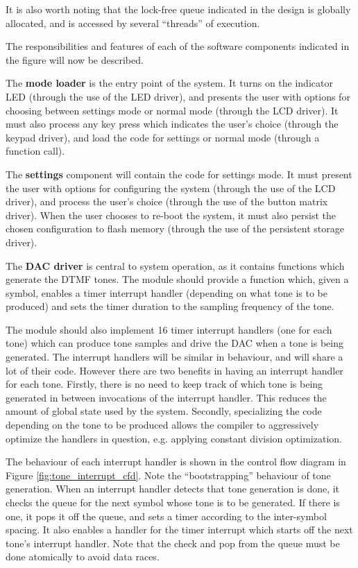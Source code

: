 \documentclass[11pt,a4paper
]{scrartcl}
\begin{document}
It is also worth noting that the lock-free queue indicated in the design is globally allocated, and is accessed by several ``threads'' of execution.

The responsibilities and features of each of the software components indicated in the figure will now be described.

The \textbf{mode loader} is the entry point of the system. It turns on the indicator LED (through the use of the LED driver), and presents the user with options
for choosing between settings mode or normal mode (through the LCD driver). It must also process any key press which indicates the user's choice 
(through the keypad driver), and load the code for settings or normal mode (through a function call).

The \textbf{settings} component will contain the code for settings mode. It must present the user with options for configuring the system (through the use of the
LCD driver), and process the user's choice (through the use of the button matrix driver). When the user chooses to re-boot the system, it must also persist the
chosen configuration to flash memory (through the use of the persistent storage driver).

The \textbf{DAC driver} is central to system operation, as it contains functions which generate the DTMF tones. The module should provide a function which, 
given a symbol, enables a timer interrupt handler (depending on what tone is to be produced) and sets the timer duration to the sampling frequency of the tone.

The module should also implement 16 timer interrupt handlers (one for each tone) which can produce tone samples and 
drive the DAC when a tone is being generated. The interrupt handlers will be similar in behaviour, and will share a lot of their code. However
there are two benefits in having an interrupt handler for each tone. Firstly, there is no need to keep track of which tone is being generated in between invocations
of the interrupt handler. This reduces the amount of global state used by the system. Secondly, specializing the code depending on the tone to be produced allows the
compiler to aggressively optimize the handlers in question, e.g. applying constant division optimization.

The behaviour of each interrupt handler is shown in the control flow diagram in Figure \ref{fig:tone_interrupt_cfd}. Note the ``bootstrapping'' behaviour of tone
generation. When an interrupt handler detects that tone generation is done, it checks the queue for the next symbol whose tone is to be generated. 
If there is one, it pops it off the queue, and sets a timer according to the inter-symbol spacing. It also enables a handler for the timer interrupt which
starts off the next tone's interrupt handler. Note that the check and pop from the queue must be done atomically to avoid data races.
\end{document}
